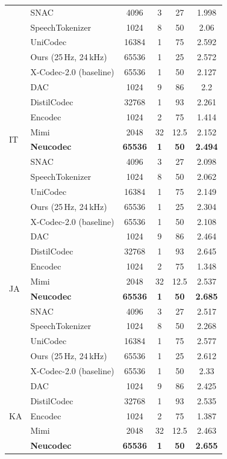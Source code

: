 \documentclass[preprint]{article}
\begin{document}
\begin{longtable}{llcccc}
  & SNAC & 4096 & 3 & 27 & 1.998 \\
  & SpeechTokenizer & 1024 & 8 & 50 & 2.06 \\
  & UniCodec & 16384 & 1 & 75 & 2.592 \\
  & Ours (25\,Hz, 24\,kHz) & 65536 & 1 & 25 & 2.572 \\
  & X-Codec-2.0 (baseline) & 65536 & 1 & 50 & 2.127 \\
\midrule
\multirow{8}{*}{IT}
  & DAC & 1024 & 9 & 86 & 2.2 \\
  & DistilCodec & 32768 & 1 & 93 & 2.261 \\
  & Encodec & 1024 & 2 & 75 & 1.414 \\
  & Mimi & 2048 & 32 & 12.5 & 2.152 \\
  & \textbf{Neucodec} & \textbf{65536} & \textbf{1} & \textbf{50} & \textbf{2.494} \\
  & SNAC & 4096 & 3 & 27 & 2.098 \\
  & SpeechTokenizer & 1024 & 8 & 50 & 2.062 \\
  & UniCodec & 16384 & 1 & 75 & 2.149 \\
  & Ours (25\,Hz, 24\,kHz) & 65536 & 1 & 25 & 2.304 \\
  & X-Codec-2.0 (baseline) & 65536 & 1 & 50 & 2.108 \\
\midrule
\multirow{8}{*}{JA}
  & DAC & 1024 & 9 & 86 & 2.464 \\
  & DistilCodec & 32768 & 1 & 93 & 2.645 \\
  & Encodec & 1024 & 2 & 75 & 1.348 \\
  & Mimi & 2048 & 32 & 12.5 & 2.537 \\
  & \textbf{Neucodec} & \textbf{65536} & \textbf{1} & \textbf{50} & \textbf{2.685} \\
  & SNAC & 4096 & 3 & 27 & 2.517 \\
  & SpeechTokenizer & 1024 & 8 & 50 & 2.268 \\
  & UniCodec & 16384 & 1 & 75 & 2.577 \\
  & Ours (25\,Hz, 24\,kHz) & 65536 & 1 & 25 & 2.612 \\
  & X-Codec-2.0 (baseline) & 65536 & 1 & 50 & 2.33 \\
\midrule
\multirow{8}{*}{KA}
  & DAC & 1024 & 9 & 86 & 2.425 \\
  & DistilCodec & 32768 & 1 & 93 & 2.535 \\
  & Encodec & 1024 & 2 & 75 & 1.387 \\
  & Mimi & 2048 & 32 & 12.5 & 2.463 \\
  & \textbf{Neucodec} & \textbf{65536} & \textbf{1} & \textbf{50} & \textbf{2.655} \\

\end{longtable}
\end{document}

